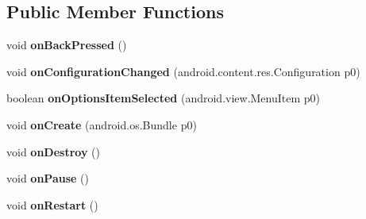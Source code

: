 \subsection*{Public Member Functions}
\begin{DoxyCompactItemize}
\item 
\hypertarget{classmd5282f1122c1313907b9bf274dd2c2f344_1_1FormsAppCompatActivity_ac3406b1effee4c244579870e610121aa}{}void {\bfseries on\+Back\+Pressed} ()\label{classmd5282f1122c1313907b9bf274dd2c2f344_1_1FormsAppCompatActivity_ac3406b1effee4c244579870e610121aa}

\item 
\hypertarget{classmd5282f1122c1313907b9bf274dd2c2f344_1_1FormsAppCompatActivity_a1e711ff0a13cbbf02568e3451d829af3}{}void {\bfseries on\+Configuration\+Changed} (android.\+content.\+res.\+Configuration p0)\label{classmd5282f1122c1313907b9bf274dd2c2f344_1_1FormsAppCompatActivity_a1e711ff0a13cbbf02568e3451d829af3}

\item 
\hypertarget{classmd5282f1122c1313907b9bf274dd2c2f344_1_1FormsAppCompatActivity_ae6e1749b0acd37228907770ccb3943d6}{}boolean {\bfseries on\+Options\+Item\+Selected} (android.\+view.\+Menu\+Item p0)\label{classmd5282f1122c1313907b9bf274dd2c2f344_1_1FormsAppCompatActivity_ae6e1749b0acd37228907770ccb3943d6}

\item 
\hypertarget{classmd5282f1122c1313907b9bf274dd2c2f344_1_1FormsAppCompatActivity_a621e8c0c8ad5e57d723f1459dc61924f}{}void {\bfseries on\+Create} (android.\+os.\+Bundle p0)\label{classmd5282f1122c1313907b9bf274dd2c2f344_1_1FormsAppCompatActivity_a621e8c0c8ad5e57d723f1459dc61924f}

\item 
\hypertarget{classmd5282f1122c1313907b9bf274dd2c2f344_1_1FormsAppCompatActivity_a636b2e8b3e0b4356b39688a54244d539}{}void {\bfseries on\+Destroy} ()\label{classmd5282f1122c1313907b9bf274dd2c2f344_1_1FormsAppCompatActivity_a636b2e8b3e0b4356b39688a54244d539}

\item 
\hypertarget{classmd5282f1122c1313907b9bf274dd2c2f344_1_1FormsAppCompatActivity_a993d510ddb7e5bffd27bc6f2675dd837}{}void {\bfseries on\+Pause} ()\label{classmd5282f1122c1313907b9bf274dd2c2f344_1_1FormsAppCompatActivity_a993d510ddb7e5bffd27bc6f2675dd837}

\item 
\hypertarget{classmd5282f1122c1313907b9bf274dd2c2f344_1_1FormsAppCompatActivity_a96edbf98de9c2385936b9d6dc7cf2fc4}{}void {\bfseries on\+Restart} ()\label{classmd5282f1122c1313907b9bf274dd2c2f344_1_1FormsAppCompatActivity_a96edbf98de9c2385936b9d6dc7cf2fc4}


\end{DoxyCompactItemize}
